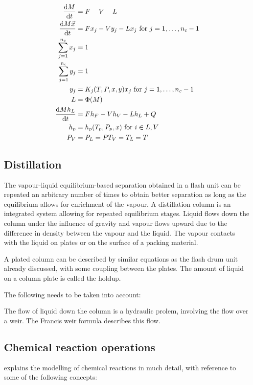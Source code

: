 \begin{align}
  \frac{\mathrm{d} M}{\mathrm{d} t} &= F - V - L \\
  \frac{\mathrm{d} M\vec{x}}{\mathrm{d} t} &= Fx_j - Vy_j - Lx_j \text{ for } j = 1,\dots,n_c-1  \\
  \sum_{j=1}^{n_c} x_j &= 1 \\
  \sum_{j=1}^{n_c} y_j &= 1 \\
  y_j &= K_j(T, P, x, y)x_j \text{ for } j = 1,\dots,n_c-1  \\
  L &= \Phi(M) \\
  \frac{\mathrm{d} Mh_L}{\mathrm{d} t} &= Fh_F - Vh_V - Lh_L + Q \\
  h_p &= h_p(T_p, P_p, x) \text{ for } i \in {L, V} \\
  P_V &= P_L = P
  T_V=T_L=T
\end{align}

\subsection{Distillation}

The vapour-liquid equilibrium-based separation obtained in a flash unit can be
repeated an arbitrary number of times to obtain better separation as
long as the equilibrium allows for enrichment of the vapour.  A
distillation column is an integrated system allowing for repeated
equilibrium stages.  Liquid flows down the column under the influence
of gravity and vapour flows upward due to the difference in density
between the vapour and the liquid.  The vapour contacts with the
liquid on plates or on the surface of a packing material.  

A plated column can be described by similar equations as the flash
drum unit already discussed, with some coupling between the plates.
The amount of liquid on a column plate is called the holdup.

The following needs to be taken into account:

The flow of liquid down the column is a hydraulic prolem, involving
the flow over a weir.  The Francis weir formula describes this flow.


\subsection{Chemical reaction operations}
\citet[347]{cellier1991continuous} explains the modelling of chemical reactions in much detail, with reference to some of the following concepts:

